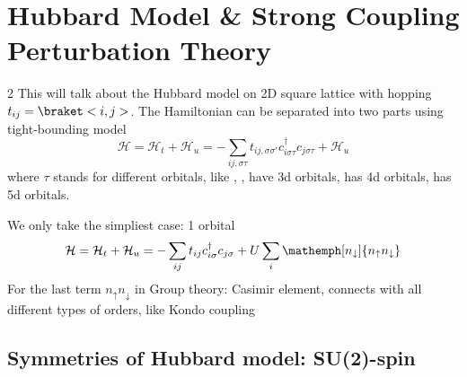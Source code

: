 
\chapter{Hubbard Model \& Strong Coupling Perturbation Theory}

\begin{paracol}{2}
This will talk about the Hubbard model on 2D square lattice with
hopping $t_{ij} = \braket<i,j>$.
The Hamiltonian can be separated into two parts using tight-bounding model
\begin{equation}
  \mathcal H = \mathcal H_t + \mathcal H_u
= -\sum_{ij,\sigma\tau} t_{ij,\sigma\sigma'}
  c_{i\sigma\tau}^\dagger c_{j\sigma\tau}
  + \mathcal H_u
\end{equation}
where $\tau$ stands for different orbitals, like
, ,  have 3d orbitals,
 has 4d orbitals,  has 5d orbitals.
\switchcolumn \centering
{}
\end{paracol}

We only take the simpliest case: 1 orbital
\begin{equation}
  \mathcal H = \mathcal H_t + \mathcal H_u
= -\sum_{ij} t_{ij} c_{i\sigma}^\dagger c_{j\sigma}
+ U \sum_i \mathemph[n_\downarrow]{n_\uparrow n_\downarrow}
\end{equation}
For the last term $n_\uparrow n_\downarrow$ in Group theory: Casimir element,
connects with all different types of orders, like Kondo coupling

\section{Symmetries of Hubbard model: SU(2)-spin}

